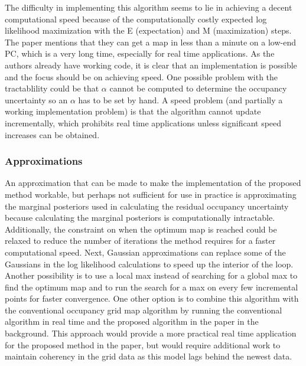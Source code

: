 \documentclass[10pt, titlepage, onecolumn, fleqn]{article}
\begin{document}
The difficulty in implementing this algorithm seems to lie in achieving a decent computational speed because of the computationally costly expected log likelihood maximization with the E (expectation) and M (maximization) steps. The paper mentions that they can get a map in less than a minute on a low-end PC, which is a very long time, especially for real time applications. As the authors already have working code, it is clear that an implementation is possible and the focus should be on achieving speed. One possible problem with the tractablility could be that $\alpha$ cannot be computed to determine the occupancy uncertainty so an $\alpha$ has to be set by hand. A speed problem (and partially a working implementation problem) is that the algorithm cannot update incrementally, which prohibits real time applications unless significant speed increases can be obtained.

\subsubsection{Approximations}

An approximation that can be made to make the implementation of the proposed method workable, but perhaps not sufficient for use in practice is approximating the marginal posteriors used in calculating the residual occupancy uncertainty because calculating the marginal posteriors is computationally intractable. Additionally, the constraint on when the optimum map is reached could be relaxed to reduce the number of iterations the method requires for a faster computational speed. Next, Gaussian approximations can replace some of the Gaussians in the log likelihood calculations to speed up the interior of the loop. Another possibility is to use a local max instead of searching for a global max to find the optimum map and to run the search for a max on every few incremental points for faster convergence. One other option is to combine this algorithm with the conventional occupancy grid map algorithm by running the conventional algorithm in real time and the proposed algorithm in the paper in the background. This approach would provide a more practical real time application for the proposed method in the paper, but would require additional work to maintain coherency in the grid data as this model lags behind the newest data.
\end{document}

